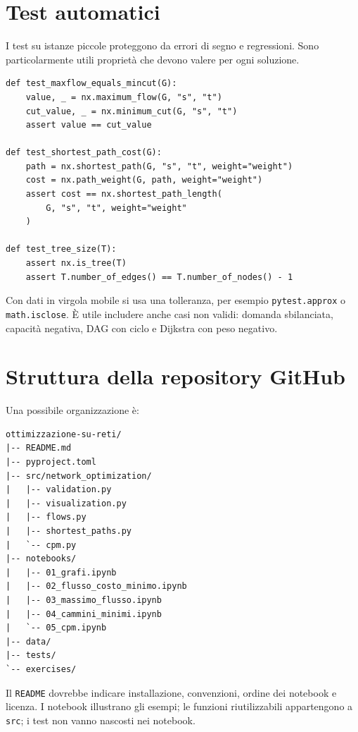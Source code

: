 \documentclass[11pt,a4paper]{article}
\begin{document}
\section{Test automatici}
I test su istanze piccole proteggono da errori di segno e regressioni. Sono particolarmente utili proprietà che devono valere per ogni soluzione.
\begin{lstlisting}[style=python,caption={Esempi di test con pytest}]
def test_maxflow_equals_mincut(G):
    value, _ = nx.maximum_flow(G, "s", "t")
    cut_value, _ = nx.minimum_cut(G, "s", "t")
    assert value == cut_value

def test_shortest_path_cost(G):
    path = nx.shortest_path(G, "s", "t", weight="weight")
    cost = nx.path_weight(G, path, weight="weight")
    assert cost == nx.shortest_path_length(
        G, "s", "t", weight="weight"
    )

def test_tree_size(T):
    assert nx.is_tree(T)
    assert T.number_of_edges() == T.number_of_nodes() - 1
\end{lstlisting}

Con dati in virgola mobile si usa una tolleranza, per esempio \texttt{pytest.approx} o \texttt{math.isclose}. È utile includere anche casi non validi: domanda sbilanciata, capacità negativa, DAG con ciclo e Dijkstra con peso negativo.

\section{Struttura della repository GitHub}
Una possibile organizzazione è:
\begin{verbatim}
ottimizzazione-su-reti/
|-- README.md
|-- pyproject.toml
|-- src/network_optimization/
|   |-- validation.py
|   |-- visualization.py
|   |-- flows.py
|   |-- shortest_paths.py
|   `-- cpm.py
|-- notebooks/
|   |-- 01_grafi.ipynb
|   |-- 02_flusso_costo_minimo.ipynb
|   |-- 03_massimo_flusso.ipynb
|   |-- 04_cammini_minimi.ipynb
|   `-- 05_cpm.ipynb
|-- data/
|-- tests/
`-- exercises/
\end{verbatim}

Il \texttt{README} dovrebbe indicare installazione, convenzioni, ordine dei notebook e licenza. I notebook illustrano gli esempi; le funzioni riutilizzabili appartengono a \texttt{src}; i test non vanno nascosti nei notebook.
\end{document}
